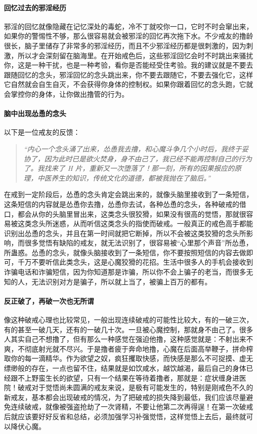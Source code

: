 \paragraph{回忆过去的邪淫经历}

邪淫的回忆就像隐藏在记忆深处的毒蛇，冷不丁就咬你一口，它时不时会窜出来，如果你的警惕性不够，那么很容易就会被邪淫的回忆再次拖下水。不少戒友的撸龄很长，脑子里储存了非常多的邪淫经历，而且不少邪淫经历都是很刺激的，因为刺激，所以才会深刻留在脑海里。在开始戒色后，这些邪淫回忆会时不时跳出来骚扰你，这是一种干扰，也是一种考验，看你是否能经受住考验。我的建议就是不要去跟随回忆的念头，邪淫回忆的念头跳出来，你不要去跟随它，不要去强化它，这样它自然就会自生自灭，不会获得你身体的控制权。如果你跟着回忆的念头跑，它就会掌控你的身体，让你做出撸管的行为。

\paragraph{脑中出现怂恿的念头}

以下是一位戒友的反馈：

\begin{quote}\it
    “内心一个念头涌了出来，怂恿我去撸，和心魔斗争几个小时后，我终于妥协了，因为此时已是欲火焚身，身不由己了，我已经不能再控制自己的行为了。我找来了 H 片，重新又一次堕落了！那一刻，所有的因果报应的原理，中医养生的知识，传统文化的道德，都被我抛在了脑后。”
\end{quote}

在戒到一定阶段后，怂恿的念头肯定会跳出来的，就像头脑里接收到了一条短信，这条短信的内容就是怂恿你去撸，怂恿你去试，各种怂恿的念头，各种破戒的借口，都会从你的头脑里冒出来，这类念头很狡猾，如果没有很高的觉悟，那就很容易被这类念头所迷惑，从而听信这类念头的指使而破戒。一般真正的戒色高手都能识别出怂恿的念头，并且在第一时间就把它断掉，所以不会被这类狡猾的念头所影响，而很多觉悟有缺陷的戒友，就无法识别了，很容易被“心里那个声音”所怂恿，所蛊惑。怂恿的念头，就像头脑接收到了一条短信，你不要按照短信的内容去做即可，千万不要听信此类念头，这是心魔狡猾的花招。生活中很多人的手机会接收到诈骗电话和诈骗短信，因为你知道那是诈骗，所以你不会上骗子的老当，而很多无知的人，无法识别对方是骗子，所以就上当了，被骗上百万的都有。

\paragraph{反正破了，再破一次也无所谓}

像这种破戒心理也比较常见，一般出现连续破戒的可能性比较大，有的一破三次，有的甚至一破几天，还有的一破几十次。一旦被心魔控制，那就身不由己了。很多人其实自己不想撸了，但有那么一种感觉在强迫他撸，这种感觉就是：不射出来不爽，不彻底射光就不尽兴。于是撸者疲于奔命地撸，心魔在后面高举鞭子，拼命榨取你的每一滴精华。作为欲望之奴，疯狂攫取快感，而快感是那么不可捉摸、虚无缥缈般的存在，一点也留不住，结果就是如饮咸水，越饮越渴，最后自己的身体已经跟不上野蛮生长的欲望，只有一个结果在等待着撸者，那就是：症状缠身进医院！破戒对于觉悟尚未圆满的戒友来说，是极有可能发生的，特别是刚戒色不久的新戒友，基本都会出现破戒的情况，为了把破戒的损失降到最低，我们应该尽量避免连续破戒，就像被强盗抢劫了一次肾精，不要让他第二次再得逞！在第一次破戒后就应该要好好反省和总结，必须加强学习补强觉悟，这样觉悟上去后，最终就可以降伏心魔。

